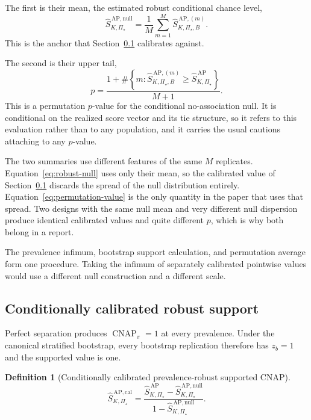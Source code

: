 \documentclass[11pt]{article}
\newcommand{\CNAP}{\operatorname{CNAP}}
\newcommand{\PSet}{\Pi_\star}
\newcommand{\SRobHat}{\widehat S_{K,\PSet}^{\,\mathrm{AP}}}
\newcommand{\SRobNullHat}{\widehat S_{K,\PSet}^{\,\mathrm{AP,null}}}
\newcommand{\SRobCalHat}{\widehat S_{K,\PSet}^{\,\mathrm{AP,cal}}}
\newtheorem{definition}{Definition}
\theoremstyle{remark}
\begin{document}
The first is their mean, the estimated robust conditional chance level,
\begin{equation}
\SRobNullHat
=
\frac{1}{M}
\sum_{m=1}^{M}
\widehat S_{K,\PSet,B}^{\,\mathrm{AP},(m)}.
\label{eq:robust-null}
\end{equation}
This is the anchor that Section~\ref{sec:calibration-def} calibrates against.

The second is their upper tail,
\begin{equation}
p
=
\frac{
1+
\#\left\{
m:
\widehat S_{K,\PSet,B}^{\,\mathrm{AP},(m)}
\geq
\SRobHat
\right\}
}{M+1}.
\label{eq:permutation-value}
\end{equation}
This is a permutation $p$-value for the conditional no-association null. It is conditional on the realized score vector and its tie structure, so it refers to this evaluation rather than to any population, and it carries the usual cautions attaching to any $p$-value.

The two summaries use different features of the same $M$ replicates. Equation~\eqref{eq:robust-null} uses only their mean, so the calibrated value of Section~\ref{sec:calibration-def} discards the spread of the null distribution entirely. Equation~\eqref{eq:permutation-value} is the only quantity in the paper that uses that spread. Two designs with the same null mean and very different null dispersion produce identical calibrated values and quite different $p$, which is why both belong in a report.

The prevalence infimum, bootstrap support calculation, and permutation average form one procedure. Taking the infimum of separately calibrated pointwise values would use a different null construction and a different scale.

\subsection{Conditionally calibrated robust support}
\label{sec:calibration-def}

Perfect separation produces $\CNAP_\pi=1$ at every prevalence. Under the canonical stratified bootstrap, every bootstrap replication therefore has $z_b=1$ and the supported value is one.

\begin{definition}[Conditionally calibrated prevalence-robust supported CNAP]
\begin{equation}
\SRobCalHat
=
\frac{
\SRobHat-\SRobNullHat
}{
1-\SRobNullHat
}.
\label{eq:robust-calibration}
\end{equation}
\end{definition}
\end{document}

